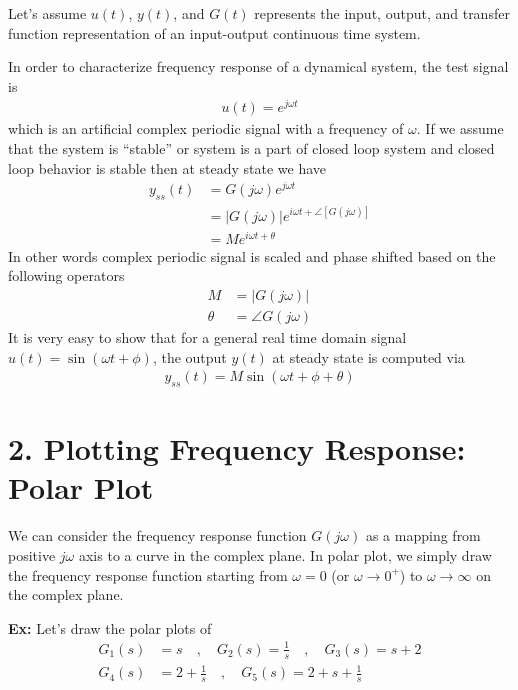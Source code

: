 \documentclass{article}
\begin{document}
\thispagestyle{empty}
\begin{center}
\end{center}
\bigskip

Let's assume $u(t)$, $y(t)$, and $G(t)$ represents the input, output,
and transfer function representation of an input-output continuous time
system.

In order to characterize frequency response of a dynamical system,
the test signal is 
%
\begin{align*}
 u(t) = e^{j \omega t}
\end{align*}
%
which is an artificial complex periodic signal with a 
frequency of $\omega$. If we assume that the system is ``stable'' or system is a part of
closed loop system and closed loop behavior is stable then
at steady state we have
%
\begin{align*}
y_{ss}(t) &= G(j \omega) e^{j \omega t} \\
&= | G(j \omega) | e^{i \omega t + \angle [ G(j \omega) ] }
\\
&= M e^{i \omega t + \theta}
\end{align*}
%
In other words complex periodic signal is scaled and phase shifted
based on the following operators
%
\begin{align*}
M &= | G(j \omega) | \\
\theta &= \angle G(j \omega)
\end{align*}
%
It is very easy to show that for a general real time domain signal
$u(t) = \sin (\omega t + \phi)$, the output $y(t)$ at steady state 
is computed via
%
\begin{align*}
  y_{ss}(t) = M \sin(\omega t + \phi + \theta)
\end{align*}

\section*{2. Plotting Frequency Response: Polar Plot}

We can consider the frequency response function $G(j \omega)$
as a mapping from positive $j \omega$ axis to a curve in 
the complex plane. In polar plot, we simply draw the frequency response
function starting from $\omega = 0$ (or $\omega \to 0^+$) to $\omega
\to \infty$ on the complex plane.

\textbf{Ex:} Let's draw the polar plots of 
%
\begin{align*}
 G_1(s) &= s
 \quad , \quad
 G_2(s) = \frac{1}{s}
 \quad , \quad
 G_3(s) = s + 2
\\
 G_4(s) &= 2 + \frac{1}{s}
\quad , \quad
 G_5(s) = 2 + s +  \frac{1}{s}
\end{align*}
\end{document}
